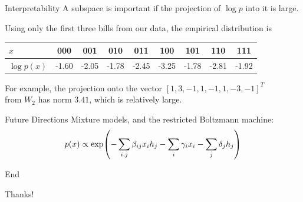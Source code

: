 \documentclass[xcolor=dvipsnames]{beamer}
\begin{document}
\begin{frame}{Interpretability}
    A subspace is important if the projection of $\log p$ into it is large.

    Using only the first three bills from our data, the empirical distribution
    is
    \begin{center}
    \begin{tabular}{l | cccc cccc}
        $x$ & 000 & 001 & 010 & 011 & 100 & 101 & 110 & 111 \\
        \hline
        $\log p(x)$ & -1.60 & -2.05 & -1.78 & -2.45 & -3.25 & -1.78 & -2.81 & -1.92
    \end{tabular}
    \end{center}
    For example, the projection onto the vector $[1, 3, -1, 1, -1, 1, -3, -1]^T$
    \\
    from $W_2$ has norm $3.41$, which is relatively large.
\end{frame}

\begin{frame}{Future Directions}
    Mixture models, and the restricted Boltzmann machine:
    \[
        p(x) \propto \exp\pdel*{-\sum_{i,j} \beta_{ij}x_i h_j - \sum_i \gamma_i
        x_i - \sum_j \delta_j h_j}
    \]
\end{frame}

\begin{frame}{End}
    \begin{center}
    Thanks!
    \end{center}
\end{frame}
\end{document}
